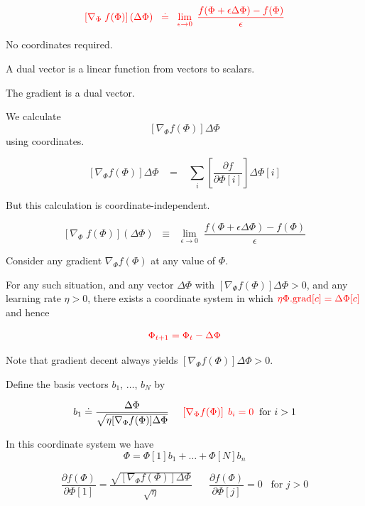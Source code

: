 {\vfill

$${\color{red} \left[\nabla_\Phi\; f(\Phi)\right](\Delta \Phi) \;\;\doteq\;\; \lim_{\epsilon \rightarrow 0} \; \frac{f(\Phi + \epsilon \Delta \Phi) - f(\Phi)}{\epsilon}}$$

\vfill
No coordinates required.


A dual vector is a linear function from vectors to scalars.

\vfill
The gradient is a dual vector.


We calculate $$\left[\nabla_\Phi f(\Phi)\right]\Delta \Phi$$  using coordinates.

$$\left[\nabla_\Phi f(\Phi)\right]\Delta \Phi \;\;\;=\;\;\; \sum_i \left[\frac{\partial f}{\partial \Phi[i]}\right] \Delta \Phi[i]$$

\vfill
But this calculation is coordinate-independent.

\vfill
$$\left[\nabla_\Phi\; f(\Phi)\right](\Delta \Phi) \;\;\equiv\;\; \lim_{\epsilon \rightarrow 0} \; \frac{f(\Phi + \epsilon \Delta \Phi) - f(\Phi)}{\epsilon}$$


Consider any gradient $\nabla_\Phi f(\Phi)$ at any value of $\Phi$.

\vfill
For any such situation, and {\color{red} any vector $\Delta \Phi$} with $\left[\nabla_\Phi f(\Phi)\right] \Delta \Phi > 0$,
and {\color{red} any learning rate $\eta > 0$},
{\color{red} there exists a coordinate system} in which ${\color{red} \eta \Phi.\mathrm{grad}[c] = \Delta \Phi[c]}$ and hence

\vfill
$${\color{red} \Phi_{t+1} = \Phi_t - \Delta \Phi}$$

\vfill
Note that gradient decent always yields $\left[\nabla_\Phi f(\Phi)\right] \Delta \Phi > 0$.

Define the basis vectors $b_1$, $\ldots$, $b_N$ by

\vfill
$$b_1 \doteq \frac{\Delta \Phi}{\sqrt{\eta[\nabla_\Phi f(\Phi)]\Delta \Phi}} \;\;\;\;\;
{\color{red} \left[\nabla_\Phi f(\Phi)\right]\;b_i = 0} \;\;\mbox{for $i > 1$}$$

In this coordinate system we have
$$\Phi = \Phi[1]b_1 + \ldots + \Phi[N]b_n$$

\vfill
$$\frac{\partial f(\Phi)}{\partial \Phi[1]} = \frac{\sqrt{[\nabla_\Phi f(\Phi)]\Delta \Phi}}{\sqrt{\eta}} \;\;\;\;\;\;
\frac{\partial f(\Phi)}{\partial \Phi[j]} = 0 \;\;\;\mbox{for $j > 0$}$$

}
